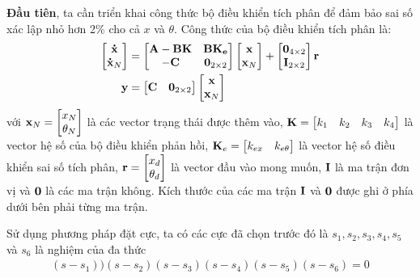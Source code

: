 \documentclass[12pt,a4paper]{article}
\begin{document}
\textbf{Đầu tiên}, ta cần triển khai công thức bộ điều khiển tích phân để đảm bảo sai số xác lập nhỏ hơn 2\% cho cả $x$ và $\theta$. Công thức của bộ điều khiển tích phân là:
\begin{align}
    \begin{bmatrix}
        \vb{\dot x} \\
        \vb{\dot x}_N
    \end{bmatrix} & = \begin{bmatrix}
        \vb{A - BK} & \vb{BK_e}\\
        \vb{-C} & \vb{0}_{2\times 2}
    \end{bmatrix}\begin{bmatrix}
        \vb{x} \\
        \vb{x}_N
    \end{bmatrix} + \begin{bmatrix}
        \vb{0}_{4\times 2} \\
        \vb{I}_{2\times 2}
    \end{bmatrix} \vb r \label{eqn:ss1}\\
    \vb y & = \begin{bmatrix}
        \vb C & \vb 0_{2\times 2} 
    \end{bmatrix} \begin{bmatrix}
        \vb{x} \\
        \vb{x}_N
    \end{bmatrix}\label{eqn:ss2}
\end{align}
với $\vb x_N = \begin{bmatrix}
    x_N \\ \theta_N 
\end{bmatrix}$ là các vector trạng thái được thêm vào, $\vb K = \begin{bmatrix}
    k_1 & k_2 & k_3 & k_4
\end{bmatrix}$ là vector hệ số của bộ điều khiển phản hồi, $\vb K_e = \begin{bmatrix}
    k_{ex} & k_{e\theta}
\end{bmatrix}$ là vector hệ số điều khiển sai số tích phân, $\vb r = \begin{bmatrix}
    x_d \\
    \theta_d
\end{bmatrix}$ là vector đầu vào mong muốn, $\vb I$ là ma trận đơn vị và $\vb 0$ là các ma trận không. Kích thước của các ma trận $\vb I$ và $\vb 0$ được ghi ở phía dưới bên phải từng ma trận.

Sử dụng phương pháp đặt cực, ta có các cực đã chọn trước đó là $s_1, s_2,s_3,s_4, s_5$ và $s_6$ là nghiệm của đa thức 
\begin{align}
    (s-s_1))(s-s_2)(s-s_3)(s-s_4)(s-s_5)(s-s_6) =0 \label{eqn:poly1}
\end{align}
\end{document}
